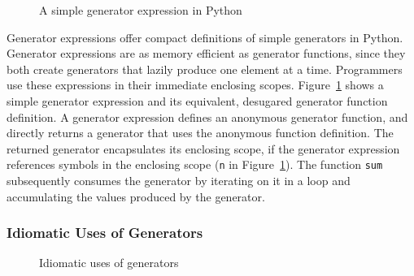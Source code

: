 \begin{figure}[h]
\centering
{}
\caption{A simple generator expression in Python}
\label{fig:ch4-genexp-example}
\end{figure}

Generator expressions offer compact definitions of simple generators in Python.
Generator expressions are as memory efficient as generator functions, since they both create generators that lazily produce one element at a time.
Programmers use these expressions in their immediate enclosing scopes.
Figure~\ref{fig:ch4-genexp-example} shows a simple generator expression and its equivalent, desugared generator function definition.
A generator expression defines an anonymous generator function, and directly returns a generator that uses the anonymous function definition.
The returned generator encapsulates its enclosing scope, if the generator expression references symbols in the enclosing scope (\texttt{n} in Figure~\ref{fig:ch4-genexp-example}).
The function \texttt{sum} subsequently consumes the generator by iterating on it in a loop and accumulating the values produced by the generator.

\subsubsection*{Idiomatic Uses of Generators}

\begin{figure}[h]
\centering
{}
\caption{Idiomatic uses of generators}
\label{fig:ch4-idiomatic-patterns}
\end{figure}

